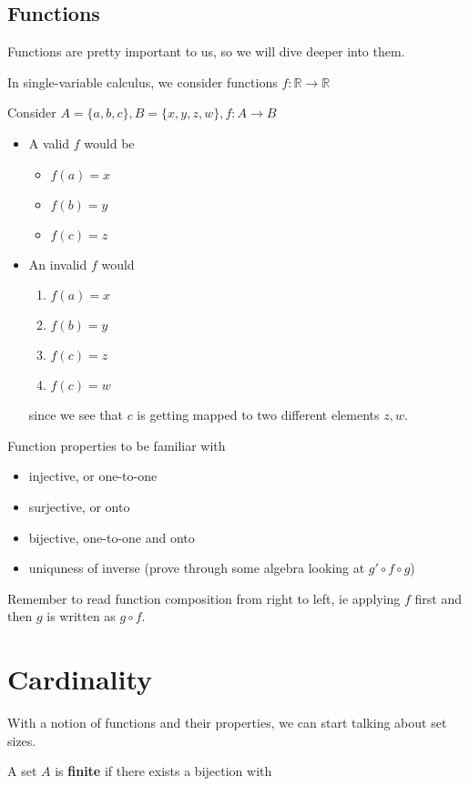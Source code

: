 \documentclass{report}
\begin{document}
\subsection{Functions}
Functions are pretty important to us, so we will dive deeper into them.
\begin{example}
    In single-variable calculus, we consider functions $f: \mathbb{R} \rightarrow \mathbb{R}$
\end{example}
\begin{example}
    Consider $A = \{a, b, c\}, B = \{x, y, z, w\}, f:A \rightarrow B$
    \begin{itemize}
        \item A valid $f$ would be
        \begin{itemize}
            \item $f(a) = x$
            \item $f(b) = y$
            \item $f(c) = z$
        \end{itemize}
        \item An invalid $f$ would \begin{enumerate}
            \item $f(a) = x$
            \item $f(b) = y$
            \item $f(c) = z$
            \item $f(c) = w$
        \end{enumerate}
        since we see that $c$ is getting mapped to two different elements $z, w$.
    \end{itemize}
    Function properties to be familiar with
    \begin{itemize}
        \item injective, or one-to-one
        \item surjective, or onto
        \item bijective, one-to-one and onto
        \item uniquness of inverse (prove through some algebra looking at $g' \circ f \circ g $)
    \end{itemize}
    Remember to read function composition from right to left, ie applying $f$ first and then $g$ is written as $g \circ f$.
\end{example}
\section{Cardinality}
With a notion of functions and their properties, we can start talking about set sizes.
\begin{definition}
    A set $A$ is \textbf{finite} if there exists a bijection with 
\end{definition}
\end{document}
